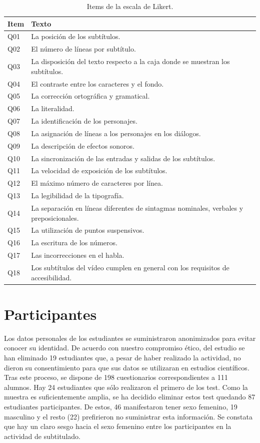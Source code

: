 \documentclass[
  12pt,
  a4paper,
  extrafontsizes,
  onecolumn,
  openright,
  table]{memoir}
\begin{document}
\hypertarget{tbl-likert-scale}{}
\begin{longtable}{ll}
\caption{\label{tbl-likert-scale}Items de la escala de Likert. }\tabularnewline

\toprule
Item & Texto \\ 
\midrule
Q01 & La posición de los subtítulos. \\ 
Q02 & El número de líneas por subtítulo. \\ 
Q03 & La disposición del texto respecto a la caja donde se muestran los subtítulos. \\ 
Q04 & El contraste entre los caracteres y el fondo. \\ 
Q05 & La corrección ortográfica y gramatical. \\ 
Q06 & La literalidad. \\ 
Q07 & La identificación de los personajes. \\ 
Q08 & La asignación de líneas a los personajes en los diálogos. \\ 
Q09 & La descripción de efectos sonoros. \\ 
Q10 & La sincronización de las entradas y salidas de los subtítulos. \\ 
Q11 & La velocidad de exposición de los subtítulos. \\ 
Q12 & El máximo número de caracteres por línea. \\ 
Q13 & La legibilidad de la tipografía. \\ 
Q14 & La separación en líneas diferentes de sintagmas nominales, verbales y preposicionales. \\ 
Q15 & La utilización de puntos suspensivos. \\ 
Q16 & La escritura de los números. \\ 
Q17 & Las incorrecciones en el habla. \\ 
Q18 & Los subtítulos del vídeo cumplen en general con los requisitos de accesibilidad. \\ 
\bottomrule
\end{longtable}

\hypertarget{participantes}{%
\section{Participantes}\label{participantes}}

Los datos personales de los estudiantes se suministraron anonimizados
para evitar conocer su identidad. De acuerdo con nuestro compromiso
ético, del estudio se han eliminado 19 estudiantes que, a pesar de haber
realizado la actividad, no dieron su consentimiento para que sus datos
se utilizaran en estudios científicos. Tras este proceso, se dispone de
198 cuestionarios correspondientes a 111 alumnos. Hay 24 estudiantes que
sólo realizaron el primero de los test. Como la muestra es
suficientemente amplia, se ha decidido eliminar estos test quedando 87
estudiantes participantes. De estos, 46 manifestaron tener sexo
femenino, 19 masculino y el resto (22) prefirieron no suministrar esta
información. Se constata que hay un claro sesgo hacia el sexo femenino
entre los participantes en la actividad de subtitulado.
\end{document}
